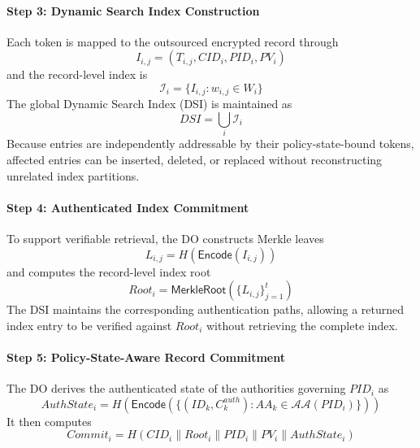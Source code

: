 \documentclass{ieeetj}
\theoremstyle{ieee-style}
\begin{document}
\paragraph*{Step 3: Dynamic Search Index Construction}

Each token is mapped to the outsourced encrypted record through
\begin{equation}
I_{i,j}
=
(T_{i,j},CID_i,PID_i,PV_i)
\label{eq:index-entry}
\end{equation}
and the record-level index is
\begin{equation}
\mathcal{I}_i
=
\{I_{i,j}:w_{i,j}\in W_i\}
\end{equation}
The global Dynamic Search Index (DSI) is maintained as
\begin{equation}
DSI=\bigcup_i\mathcal{I}_i
\end{equation}
Because entries are independently addressable by their policy-state-bound
tokens, affected entries can be inserted, deleted, or replaced without
reconstructing unrelated index partitions.

\paragraph*{Step 4: Authenticated Index Commitment}

To support verifiable retrieval, the DO constructs Merkle leaves
\begin{equation}
L_{i,j}
=
H\!\left(
\mathsf{Encode}(I_{i,j})
\right)
\end{equation}
and computes the record-level index root
\begin{equation}
Root_i
=
\mathsf{MerkleRoot}
\left(
\{L_{i,j}\}_{j=1}^{t}
\right)
\label{eq:index-root}
\end{equation}
The DSI maintains the corresponding authentication paths, allowing a
returned index entry to be verified against $Root_i$ without retrieving
the complete index.

\paragraph*{Step 5: Policy-State-Aware Record Commitment}

The DO derives the authenticated state of the authorities governing
$PID_i$ as
\begin{equation}
AuthState_i
=
H\!\left(
\mathsf{Encode}
\left(
\{(ID_k,C_k^{auth}):
AA_k\in\mathcal{AA}(PID_i)\}
\right)
\right)
\label{eq:policy-auth-state}
\end{equation}
It then computes
\begin{equation}
Commit_i
=
H\!\left(
CID_i
\parallel Root_i
\parallel PID_i
\parallel PV_i
\parallel AuthState_i
\right)
\label{eq:record-commitment}
\end{equation}
\end{document}
